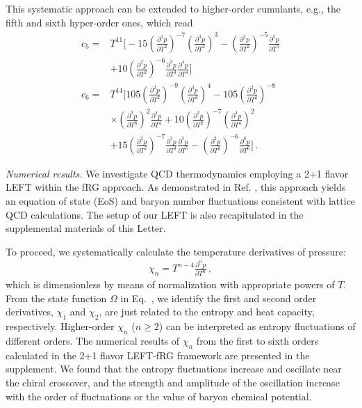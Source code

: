 \documentclass[aps,twocolumn,prd,superscriptaddress,nofootinbib,floatfix]{revtex4-2} %
\providecommand{\DIFaddtex}[1]{{\protect\color{blue}\uwave{#1}}} %
\providecommand{\DIFaddbegin}{} %
\providecommand{\DIFaddend}{} %
\providecommand{\DIFadd}[1]{\texorpdfstring{\DIFaddtex{#1}}{#1}} %
\newcommand{\DIFaddincludegraphics}[2][]{{\color{blue}\fbox{\DIFOincludegraphics[#1]{#2}}}} %
\DeclareRobustCommand{\DIFaddbegin}{\DIFOaddbegin \let\includegraphics\DIFaddincludegraphics} %
\DeclareRobustCommand{\DIFaddend}{\DIFOaddend \let\includegraphics\DIFOincludegraphics} %
\begin{document}
This systematic approach can be extended to higher-order cumulants, e.g., the fifth and sixth hyper-order ones, which read
\begin{equation}\label{eq:c56}\begin{split}
    c_5=&T^{11}\Bigg[-15\left(\frac{\partial^2 p}{\partial T^2}\right)^{-7}\left(\frac{\partial^3 p}{\partial T^3}\right)^3-\left(\frac{\partial^2 p}{\partial T^2}\right)^{-5}\frac{\partial^5 p}{\partial T^5}\\[2ex]
    &+10\left(\frac{\partial^2 p}{\partial T^2}\right)^{-6}\frac{\partial^3 p}{\partial T^3}\frac{\partial^4 p}{\partial T^4}\Bigg]\,\\[2ex]
     c_6=&T^{14}\Bigg[105\left(\frac{\partial^2 p}{\partial T^2}\right)^{-9}\left(\frac{\partial^3 p}{\partial T^3}\right)^4-105\left(\frac{\partial^2 p}{\partial T^2}\right)^{-8}\\[2ex]
    &\times\left(\frac{\partial^3 p}{\partial T^3}\right)^2\frac{\partial^4 p}{\partial T^4}+10\left(\frac{\partial^2 p}{\partial T^2}\right)^{-7}\left(\frac{\partial^4 p}{\partial T^4}\right)^2\\[2ex]
    &+15\left(\frac{\partial^2 p}{\partial T^2}\right)^{-7}\frac{\partial^3 p}{\partial T^3}\frac{\partial^5 p}{\partial T^5}-\left(\frac{\partial^2 p}{\partial T^2}\right)^{-6}\frac{\partial^6 p}{\partial T^6}\Bigg]\,.
\end{split} 
\end{equation}


\textit{Numerical results.}\label{sec:numerical} We investigate QCD thermodynamics employing a 2+1 flavor LEFT within the fRG approach. As demonstrated in Ref. \cite{Wen:2018nkn}, this approach yields an equation of state (EoS) and baryon number fluctuations consistent with lattice QCD calculations. The setup of our LEFT is also recapitulated in the supplemental materials of this Letter.

To proceed, we systematically calculate the temperature derivatives of pressure: 
\begin{align}
    \chi_n=T^{n-4}\frac{\partial^n p}{\partial T^n}\,, \label{eq:chi}
\end{align}
which is dimensionless by means of normalization with appropriate powers of $T$. From the state function $\Omega$ in Eq.~, we identify the first and second order derivatives, $\chi_1$ and $\chi_2$, are just related to the entropy and heat capacity, respectively. Higher-order $\chi_n$ ($n \geq 2$) can be interpreted as entropy fluctuations of different orders. The numerical results of $\chi_n$ from the first to sixth orders calculated in the 2+1 flavor LEFT-fRG framework are presented in the supplement. We found that the entropy fluctuations increase and oscillate near the chiral crossover, and the strength and amplitude of the oscillation increase with the order of fluctuations or the value of \DIFaddbegin \DIFadd{the }\DIFaddend baryon chemical potential. 
\end{document}
